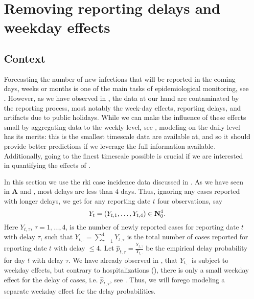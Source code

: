 \section{Removing reporting delays and weekday effects}%
\label{sec:model_reporting_delay}
\subsection{Context}
Forecasting the number of new infections that will be reported in the coming days, weeks or months is one of the main tasks of epidemiological monitoring, see . However, as we have observed in , the data at our hand are contaminated by the reporting process, most notably the week-day effects, reporting delays, and artifacts due to public holidays.
While we can make the influence of these effects small by aggregating data to the weekly level, see , modeling on the daily level has its merits: this is the smallest timescale data are available at, and so it should provide better predictions if we leverage the full information available. Additionally, going to the finest timescale possible is crucial if we are interested in quantifying the effects of .

In this section we use the \acrshort{rki} case incidence data discussed in . As we have seen in  \textbf{A} and , most delays are less than $4$ days. Thus, ignoring any cases reported with longer delays, we get for any reporting date $t$ four observations, say 
$$
    Y_{t} = \left( Y_{t, 1}, \dots, Y_{t, 4} \right) \in \mathbf N^{4}_{0}.
$$
Here $Y_{t,\tau}$, $\tau = 1, \dots, 4$, is the number of newly reported cases for reporting date $t$ with delay $\tau$, such that $Y_{t,\cdot} = \sum_{\tau = 1}^4 Y_{t, \tau}$ is the total number of cases reported for reporting date $t$ with delay $\leq 4$. 
Let $\hat p_{t, \tau} = \frac{Y_{t,\tau}}{Y_{t,\cdot}}$ be the empirical delay probability for day $t$ with delay $\tau$. We have already observed in , that $Y_{t, \cdot}$ is subject to weekday effects, but contrary to hospitalizations (), there is only a small weekday effect for the delay of cases, i.e. $\hat p_{t,\tau}$, see . Thus, we will forego modeling a separate weekday effect for the delay probabilities.


